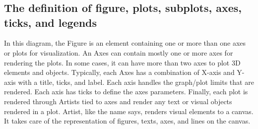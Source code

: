 \chapter{}
\section{The definition of figure, plots, subplots, axes, ticks, and legends}
In this diagram, the Figure is an element containing one or more than one axes or plots for visualization. An Axes can contain mostly one or more axes for rendering the plots. In some cases, it can have more than two axes to plot 3D elements and objects. Typically, each Axes has a combination of X-axis and Y-axis with a title, ticks, and label. Each axis handles the graph/plot limits that are rendered. Each axis has ticks to define the axes parameters. Finally, each plot is rendered through Artists tied to axes and render any text or visual objects rendered in a plot. Artist, like the name says, renders visual elements to a canvas. It takes care of the representation of figures, texts, axes, and lines on the canvas.

